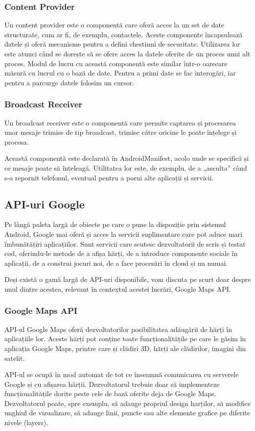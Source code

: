 \documentclass[12pt,a4paper]{article}
\begin{document}
\subsubsection{Content Provider}
Un content provider este o componentă care oferă acces la un set de date structurate, cum ar fi, de exemplu, contactele. Aceste componente încapsulează datele și oferă mecanisme pentru a defini chestiuni de securitate. Utilizarea lor este atunci când se dorește să se ofere acces la datele oferite de un proces unui alt proces.
Modul de lucru cu această componentă este similar într-o oarecare măsură cu lucrul cu o bază de date. Pentru a primi date se fac interogări, iar pentru a parcurge datele folosim un cursor.

\subsubsection{Broadcast Receiver}
Un broadcast receiver este o componentă care permite captarea și procesarea unor mesaje trimise de tip broadcast, trimise către oricine le poate înțelege și procesa.

Această componentă este declarată în AndroidManifest, acolo unde se specifică și ce mesaje poate să înțeleagă. Utilitatea lor este, de exemplu, de a „asculta” când s-a repornit telefonul, eventual pentru a porni alte aplicații și servicii.


\subsection{API-uri Google}
Pe lângă paleta largă de obiecte pe care o pune la dispoziție prin sistemul Android, Google mai oferă și acces la servicii suplimentare care pot aduce mari îmbunătățiri aplicațiilor. Sunt servicii care scutesc dezvoltatorii de scris și testat cod, oferindu-le metode de a afișa hărți, de a introduce componente sociale în aplicații, de a construi jocuri noi, de a face procesări în cloud și nu numai.

Deși există o gamă largă de API-uri disponibile, vom discuta pe scurt doar despre unul dintre acestea, relevant în contextul acestei lucrări, Google Maps API.

\subsubsection{Google Maps API}
API-ul Google Maps oferă dezvoltatorilor posibilitatea adăugării de hărți în aplicațiile lor. Aceste hărți pot conține toate funcționalitățile pe care le găsim în aplicația Google Maps, printre care și clădiri 3D, hărți ale clădirilor, imagini din satelit.

API-ul se ocupă în mod automat de tot ce înseamnă comunicarea cu serverele Google și cu afișarea hărții. Dezvoltatorul trebuie doar să implementeze funcționalitățile dorite peste cele de bază oferite deja de Google Maps. Dezvoltatorul poate, spre exemplu, să adauge propriul design harților, să modifice unghiul de vizualizare, să adauge linii, puncte sau alte elemente grafice pe diferite nivele (layers).
\end{document}
